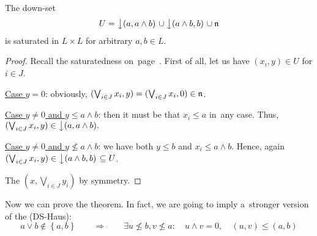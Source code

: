 \begin{lem} \label{downsets-satur}
  The down-set
  \[
    U = \left\downarrow(a, a \wedge b)\right. \cup \left\downarrow(a \wedge b,
        b)\right. \cup \mathfrak{n}
  \]
  is saturated in $L \times L$ for arbitrary $a, b\in L$.
\end{lem}
\begin{proof}
  Recall the saturatedness on~page~\pageref{df:satur}\thinspace.
  First of all, let us have $(x_i, y)\in U$ for $i\in J$.

  \underline{Case $y = 0$}:
  obviously, $(\bigvee_{i\in J} x_i, y) = (\bigvee_{i\in J} x_i, 0)\in \mathfrak{n}$.

  \underline{Case $y \ne 0$ and $y \leq a \wedge b$}:
  then it must be that $x_i \leq a$ in~any case.
  Thus, $(\bigvee_{i\in J} x_i, y) \in \left\downarrow(a, a \wedge b).\right.$

  \underline{Case $y \ne 0$ and $y \not\leq a \wedge b$}:
  we have both $y \leq b$ and $x_i \leq a \wedge b$.
  Hence, again $(\bigvee_{i\in J} x_i, y) \in \left\downarrow(a \wedge b,
  b)\right. \subseteq U$.

  The $(x, \bigvee_{i\in J} y_i)$ by symmetry.
\end{proof}

Now we can prove the theorem.
In fact, we are going to imply a~stronger version of the (DS-Haus):
\[
  a \vee b \not\in \left\{a, b\right\} \qquad \Rightarrow \qquad \exists
  u\not\leq b, v\not\leq a: \quad u \wedge v = 0, \quad \boxed{\left(u,
  v\right) \leq \left(a, b\right)}
\]

